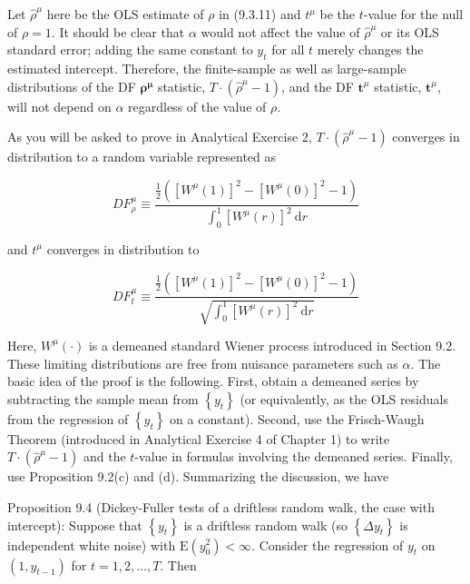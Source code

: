 \documentclass[10pt]{article}
\begin{document}
Let $\hat{\rho}^{\mu}$ here be the OLS estimate of $\rho$ in (9.3.11) and $t^{\mu}$ be the $t$-value for the null of $\rho=1$. It should be clear that $\alpha$ would not affect the value of $\hat{\rho}^{\mu}$ or its OLS standard error; adding the same constant to $y_{t}$ for all $t$ merely changes the estimated intercept. Therefore, the finite-sample as well as large-sample distributions of the DF $\boldsymbol{\rho}^{\boldsymbol{\mu}}$ statistic, $T \cdot\left(\hat{\rho}^{\mu}-1\right)$, and the DF $\boldsymbol{t}^{\mu}$ statistic, $\boldsymbol{t}^{\mu}$, will not depend on $\alpha$ regardless of the value of $\rho$.

As you will be asked to prove in Analytical Exercise 2, $T \cdot\left(\hat{\rho}^{\mu}-1\right)$ converges in distribution to a random variable represented as


\begin{equation*}
D F_{\rho}^{\mu} \equiv \frac{\frac{1}{2}\left(\left[W^{\mu}(1)\right]^{2}-\left[W^{\mu}(0)\right]^{2}-1\right)}{\int_{0}^{1}\left[W^{\mu}(r)\right]^{2} \mathrm{~d} r} \tag{9.3.13}
\end{equation*}


and $t^{\mu}$ converges in distribution to


\begin{equation*}
D F_{t}^{\mu} \equiv \frac{\frac{1}{2}\left(\left[W^{\mu}(1)\right]^{2}-\left[W^{\mu}(0)\right]^{2}-1\right)}{\sqrt{\int_{0}^{1}\left[W^{\mu}(r)\right]^{2} \mathrm{~d} r}} \tag{9.3.14}
\end{equation*}


Here, $W^{\mu}(\cdot)$ is a demeaned standard Wiener process introduced in Section 9.2. These limiting distributions are free from nuisance parameters such as $\alpha$. The basic idea of the proof is the following. First, obtain a demeaned series by subtracting the sample mean from $\left\{y_{t}\right\}$ (or equivalently, as the OLS residuals from the regression of $\left\{y_{t}\right\}$ on a constant). Second, use the Frisch-Waugh Theorem (introduced in Analytical Exercise 4 of Chapter 1) to write $T \cdot\left(\hat{\rho}^{\mu}-1\right)$ and the $t$-value in formulas involving the demeaned series. Finally, use Proposition 9.2(c) and (d). Summarizing the discussion, we have

Proposition 9.4 (Dickey-Fuller tests of a driftless random walk, the case with intercept): Suppose that $\left\{y_{t}\right\}$ is a driftless random walk (so $\left\{\Delta y_{t}\right\}$ is independent white noise) with $\mathrm{E}\left(y_{0}^{2}\right)<\infty$. Consider the regression of $y_{t}$ on $\left(1, y_{t-1}\right)$ for $t=1,2, \ldots, T$. Then
\end{document}
